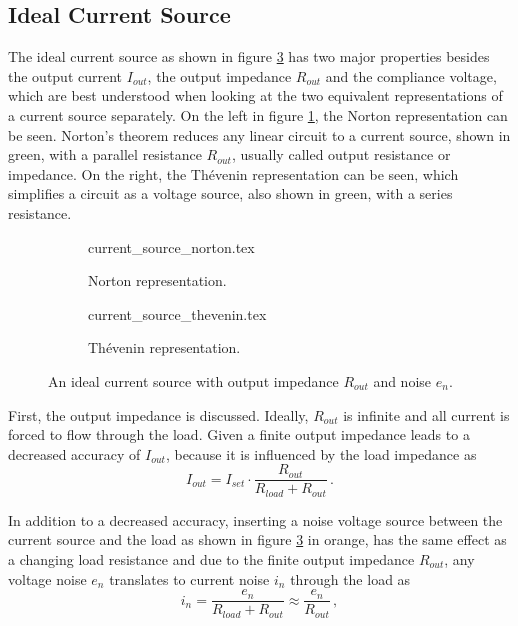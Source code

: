 \subsection{Ideal Current Source}
\label{sec:ideal_current_source}
The ideal current source as shown in figure \ref{fig:ideal_current_source} has two major properties besides the output current $I_{out}$, the output impedance $R_{out}$ and the compliance voltage, which are best understood when looking at the two equivalent representations of a current source separately. On the left in figure \ref{fig:ideal_current_source_norton}, the Norton representation can be seen. Norton's theorem reduces any linear circuit to a current source, shown in green, with a parallel resistance $R_{out}$, usually called output resistance or impedance. On the right, the Thévenin representation can be seen, which simplifies a circuit as a voltage source, also shown in green, with a series resistance.
\begin{figure}[ht]
    \centering
    \begin{subfigure}{0.4\linewidth}
        \centering
        {current_source_norton.tex}
        \caption{Norton representation.}
        \label{fig:ideal_current_source_norton}
    \end{subfigure}
    \begin{subfigure}{0.4\linewidth}
        \centering
        {current_source_thevenin.tex}
        \caption{Thévenin representation.}
        \label{fig:ideal_current_source_thevenin}
    \end{subfigure}
    \caption{An ideal current source with output impedance $R_{out}$ and noise $e_n$.}
    \label{fig:ideal_current_source}
\end{figure}

First, the output impedance is discussed. Ideally, $R_{out}$ is infinite and all current is forced to flow through the load. Given a finite output impedance leads to a decreased accuracy of $I_{out}$, because it is influenced by the load impedance as
\begin{equation}
    I_{out} = I_{set} \cdot \frac{R_{out}}{R_{load} + R_{out}} \, .
\end{equation}

In addition to a decreased accuracy, inserting a noise voltage source between the current source and the load as shown in figure \ref{fig:ideal_current_source} in orange, has the same effect as a changing load resistance and due to the finite output impedance $R_{out}$, any voltage noise $e_n$ translates to current noise $i_n$ through the load as
\begin{equation}
    i_n = \frac{e_n}{R_{load} + R_{out}} \approx \frac{e_n}{R_{out}} \, ,
\end{equation}

